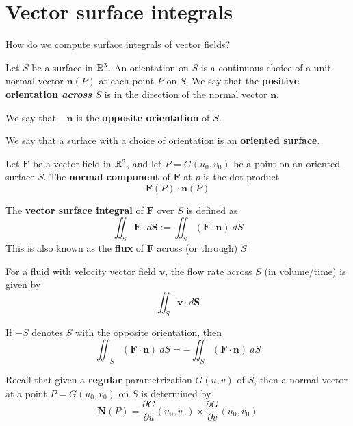 \section{Vector surface integrals}

\begin{motivating}
    How do we compute surface integrals of vector fields?
\end{motivating}

\begin{definition}
    Let $S$ be a surface in $\mathbb{R}^3$. An orientation on $S$ is a continuous choice of a unit normal vector $\bm{n}(P)$ at each point $P$ on $S$.  We say that the \textbf{positive orientation \textit{across} $S$} is in the direction of the normal vector $\bm{n}$.
    
    We say that $-\bm{n}$ is the \textbf{opposite orientation} of $S$.
    
    
    We say that a surface with a choice of orientation is an \textbf{oriented surface}.
    
    \end{definition}

\begin{definition}
    Let $\bm{F}$ be a vector field in $\mathbb{R}^3$, and let $P = G(u_0,v_0)$ be a point on an oriented surface $S$.  The \textbf{normal component} of $\bm{F}$ at $p$ is the dot product 
    $$\bm{F}(P) \cdot \bm{n}(P)$$
    \end{definition}

\begin{definition}
    The \textbf{vector surface integral} of $\bm{F}$ over $S$ is defined as
    $$\iint_S \bm{F} \cdot d\bm{S} := \iint_S (\bm{F} \cdot \bm{n}) \ dS$$
    This is also known as the \textbf{flux} of $\bm{F}$ across (or through) $S$.
    \end{definition}

    \begin{definition}
    For a fluid with velocity vector field $\bm{v}$, the flow rate across $S$ (in volume/time) is given by 
    $$\iint_S \bm{v} \cdot d\bm{S}$$
    \end{definition}

\begin{theorem}
    If $-S$ denotes $S$ with the opposite orientation, then $$\iint_{-S} (\bm{F} \cdot \bm{n}) \ dS = -\iint_S (\bm{F} \cdot \bm{n}) \ dS$$
    \end{theorem}

Recall that given a \textbf{regular} parametrization $G(u,v)$ of $S$, then a normal vector at a point $P = G(u_0,v_0)$ on $S$ is determined by 
    $$\bm{N}(P) =  \frac{\partial G}{\partial u}(u_0,v_0) \times \frac{\partial G}{\partial v}(u_0,v_0)$$ 

